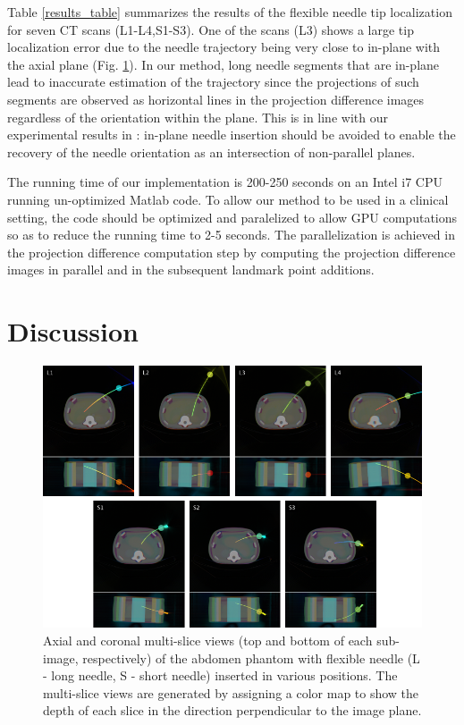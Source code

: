 Table \ref{results_table} summarizes the results of the flexible needle tip localization for seven CT scans (L1-L4,S1-S3). One of the scans (L3) shows a large tip localization error due to the needle trajectory being very close to in-plane with the axial plane (Fig. \ref{multislices_fig}). In our method, long needle segments that are in-plane lead to inaccurate estimation of the trajectory since the projections of such segments are observed as horizontal lines in the projection difference images regardless of the orientation within the plane. This is in line with our experimental results in \cite{medan2017reduced}: in-plane needle insertion should be avoided to enable the recovery of the needle orientation as an intersection of non-parallel planes.

The running time of our implementation is 200-250 seconds on an Intel i7 CPU running un-optimized Matlab code. To allow our method to be used in a clinical setting, the code should be optimized and paralelized to allow GPU computations so as to reduce the running time to 2-5 seconds. The parallelization is achieved in the projection difference computation step by computing the projection difference images in parallel and in the subsequent landmark point additions.  

\section*{Discussion}

\begin{figure}[t]
\centering
\includegraphics[width=\textwidth]{multislices.png}
\caption{Axial and coronal multi-slice views (top and bottom of each sub-image, respectively) of the abdomen phantom with flexible needle (L - long needle, S - short needle) inserted in various positions. The multi-slice views are generated by assigning a color map to show the depth of each slice in the direction perpendicular to the image plane.}
\label{multislices_fig}
\end{figure}

